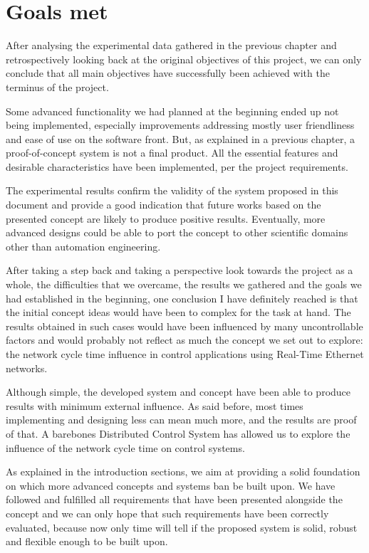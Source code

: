 \section{Goals met} \label{sec:goals-met}
After analysing the experimental data gathered in the previous chapter and retrospectively looking back at the original objectives of this project, we can only conclude that all main objectives have successfully been achieved with the terminus of the project.

Some advanced functionality we had planned at the beginning ended up not being implemented, especially improvements addressing mostly user friendliness and ease of use on the software front.
But, as explained in a previous chapter, a proof-of-concept system is not a final product.
All the essential features and desirable characteristics have been implemented, per the project requirements.

The experimental results confirm the validity of the system proposed in this document and provide a good indication that future works based on the presented concept are likely to produce positive results.
Eventually, more advanced designs could be able to port the concept to other scientific domains other than automation engineering.

After taking a step back and taking a perspective look towards the project as a whole, the difficulties that we overcame, the results we gathered and the goals we had established in the beginning, one conclusion I have definitely reached is that the initial concept ideas would have been to complex for the task at hand.
The results obtained in such cases would have been influenced by many uncontrollable factors and would probably not reflect as much the concept we set out to explore: the network cycle time influence in control applications using Real-Time Ethernet networks.

Although simple, the developed system and concept have been able to produce results with minimum external influence.
As said before, most times implementing and designing less can mean much more, and the results are proof of that.
A barebones Distributed Control System has allowed us to explore the influence of the network cycle time on control systems.

As explained in the introduction sections, we aim at providing a solid foundation on which more advanced concepts and systems ban be built upon.
We have followed and fulfilled all requirements that have been presented alongside the concept and we can only hope that such requirements have been correctly evaluated, because now only time will tell if the proposed system is solid, robust and flexible enough to be built upon.
